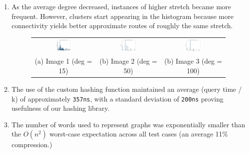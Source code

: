 \documentclass{article}
\begin{document}
\begin{enumerate}
    \item As the average degree decreased, instances of higher stretch became more frequent. However, clusters start appearing in the histogram because more connectivity yields better approximate routes of roughly the same stretch.
    
    \begin{figure}[H]
        \centering
        \begin{tabular}{ccc}
            \includegraphics[width=0.3\textwidth]{img/test19.png} &
            \includegraphics[width=0.3\textwidth]{img/test20.png} &
            \includegraphics[width=0.3\textwidth]{img/test21.png}\\
            (a) Image 1 (deg = 15) & (b) Image 2 (deg = 50) & (b) Image 3 (deg = 100) \\
        \end{tabular}
        \label{fig:555}
    \end{figure}

    \item The use of the custom hashing function maintained an average (query time / k) of approximately \texttt{357ns}, with a standard deviation of \texttt{200ns} proving usefulness of our hashing library.

    \item The number of words used to represent graphs was exponentially smaller than the $O(n^2)$ worst-case expectation across all test cases (an average 11\% compression.)
    
\end{enumerate}
\end{document}
